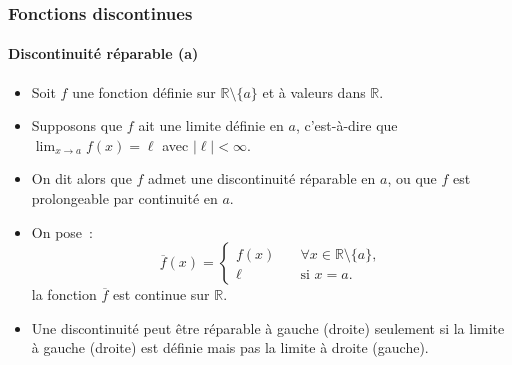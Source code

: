 \documentclass[10pt,notheorems]{beamer}
\theoremstyle{plain}
\theoremstyle{definition} %
\begin{document}
\begin{frame}
  \frametitle{Fonctions discontinues}
  \framesubtitle{Discontinuité réparable (a)}

  \begin{itemize}

  \item Soit $f$ une fonction définie sur $\mathbb R\setminus \{a\}$ et à valeurs dans $\mathbb R$.\newline

  \item Supposons que $f$ ait une limite définie en $a$, c'est-à-dire que $\lim_{x\rightarrow a}f(x) = \ell$ avec $|\ell|<\infty$.\newline

  \item On dit alors que $f$ admet une discontinuité réparable en $a$, ou que $f$ est prolongeable par continuité en $a$.\newline

  \item On pose~:
    \[
      \overline{f}(x) =
      \begin{cases}
        f(x) \quad&\forall x\in\mathbb R\setminus \{a\},\\
        \ell  &\text{si $x=a$.}
      \end{cases}
    \]
    la fonction $\overline{f}$ est continue sur $\mathbb R$.\newline

  \item Une discontinuité peut être réparable à gauche (droite) seulement si la limite à gauche (droite) est définie mais pas la limite à droite (gauche).

  \end{itemize}

\end{frame}
\end{document}
